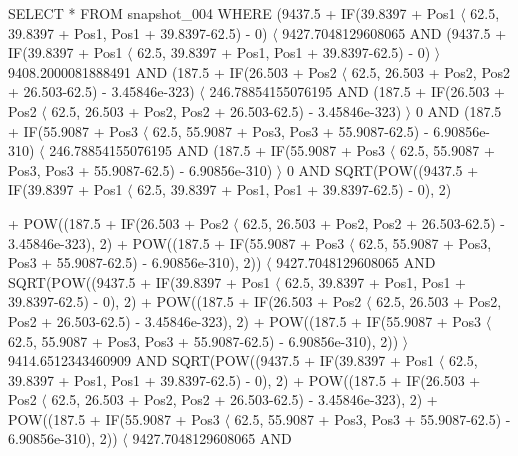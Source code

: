 \begin{frame}[plain]
  \hspace{2cm}
\end{frame}

\begin{frame}[plain]
SELECT * FROM snapshot\_004 WHERE (9437.5 + IF(39.8397 + Pos1 $\langle$ 62.5, 39.8397 + Pos1, Pos1 + 39.8397-62.5) - 0) $\langle$ 9427.7048129608065 AND (9437.5 + IF(39.8397 + Pos1 $\langle$ 62.5, 39.8397 + Pos1, Pos1 + 39.8397-62.5) - 0) $\rangle$ 9408.2000081888491 AND (187.5 + IF(26.503 + Pos2 $\langle$ 62.5, 26.503 + Pos2, Pos2 + 26.503-62.5) - 3.45846e-323) $\langle$ 246.78854155076195 AND (187.5 + IF(26.503 + Pos2 $\langle$ 62.5, 26.503 + Pos2, Pos2 + 26.503-62.5) - 3.45846e-323) $\rangle$ 0 AND (187.5 + IF(55.9087 + Pos3 $\langle$ 62.5, 55.9087 + Pos3, Pos3 + 55.9087-62.5) - 6.90856e-310) $\langle$ 246.78854155076195 AND (187.5 + IF(55.9087 + Pos3 $\langle$ 62.5, 55.9087 + Pos3, Pos3 + 55.9087-62.5) - 6.90856e-310) $\rangle$ 0 AND SQRT(POW((9437.5 + IF(39.8397 + Pos1 $\langle$ 62.5, 39.8397 + Pos1, Pos1 + 39.8397-62.5) - 0), 2)
\end{frame}

\begin{frame}[plain]
+ POW((187.5 + IF(26.503 + Pos2 $\langle$ 62.5, 26.503 + Pos2, Pos2 + 26.503-62.5) - 3.45846e-323), 2) + POW((187.5 + IF(55.9087 + Pos3 $\langle$ 62.5, 55.9087 + Pos3, Pos3 + 55.9087-62.5) - 6.90856e-310), 2)) $\langle$ 9427.7048129608065 AND SQRT(POW((9437.5 + IF(39.8397 + Pos1 $\langle$ 62.5, 39.8397 + Pos1, Pos1 + 39.8397-62.5) - 0), 2) + POW((187.5 + IF(26.503 + Pos2 $\langle$ 62.5, 26.503 + Pos2, Pos2 + 26.503-62.5) - 3.45846e-323), 2) + POW((187.5 + IF(55.9087 + Pos3 $\langle$ 62.5, 55.9087 + Pos3, Pos3 + 55.9087-62.5) - 6.90856e-310), 2)) $\rangle$ 9414.6512343460909 AND SQRT(POW((9437.5 + IF(39.8397 + Pos1 $\langle$ 62.5, 39.8397 + Pos1, Pos1 + 39.8397-62.5) - 0), 2) + POW((187.5 + IF(26.503 + Pos2 $\langle$ 62.5, 26.503 + Pos2, Pos2 + 26.503-62.5) - 3.45846e-323), 2) + POW((187.5 + IF(55.9087 + Pos3 $\langle$ 62.5, 55.9087 + Pos3, Pos3 + 55.9087-62.5) - 6.90856e-310), 2)) $\langle$ 9427.7048129608065 AND
\end{frame}

